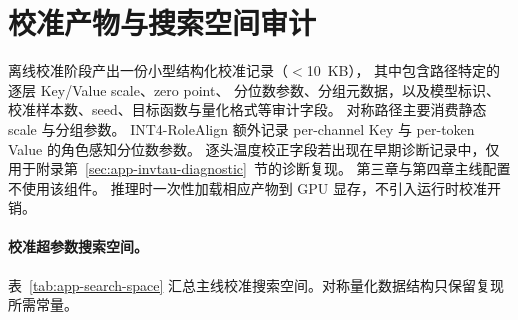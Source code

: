 \section{校准产物与搜索空间审计}
\label{sec:app-calib-schema}

离线校准阶段产出一份小型结构化校准记录（$<$10~KB），
其中包含路径特定的逐层 Key/Value scale、zero point、
分位数参数、分组元数据，以及模型标识、校准样本数、seed、目标函数与量化格式等审计字段。
对称路径主要消费静态 scale 与分组参数。
INT4-RoleAlign 额外记录 per-channel Key 与 per-token Value 的角色感知分位数参数。
逐头温度校正字段若出现在早期诊断记录中，仅用于附录第~\ref{sec:app-invtau-diagnostic}~节的诊断复现。
第三章与第四章主线配置不使用该组件。
推理时一次性加载相应产物到 GPU 显存，不引入运行时校准开销。

\paragraph{校准超参数搜索空间。}
\label{sec:app-calib-search-space}

表~\ref{tab:app-search-space} 汇总主线校准搜索空间。对称量化数据结构只保留复现所需常量。

